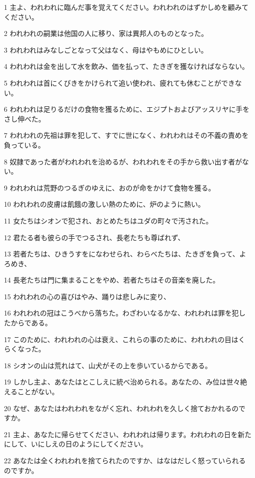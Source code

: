 \par 1 主よ、われわれに臨んだ事を覚えてください。われわれのはずかしめを顧みてください。
\par 2 われわれの嗣業は他国の人に移り、家は異邦人のものとなった。
\par 3 われわれはみなしごとなって父はなく、母はやもめにひとしい。
\par 4 われわれは金を出して水を飲み、価を払って、たきぎを獲なければならない。
\par 5 われわれは首にくびきをかけられて追い使われ、疲れても休むことができない。
\par 6 われわれは足りるだけの食物を獲るために、エジプトおよびアッスリヤに手をさし伸べた。
\par 7 われわれの先祖は罪を犯して、すでに世になく、われわれはその不義の責めを負っている。
\par 8 奴隷であった者がわれわれを治めるが、われわれをその手から救い出す者がない。
\par 9 われわれは荒野のつるぎのゆえに、おのが命をかけて食物を獲る。
\par 10 われわれの皮膚は飢餓の激しい熱のために、炉のように熱い。
\par 11 女たちはシオンで犯され、おとめたちはユダの町々で汚された。
\par 12 君たる者も彼らの手でつるされ、長老たちも尊ばれず、
\par 13 若者たちは、ひきうすをになわせられ、わらべたちは、たきぎを負って、よろめき、
\par 14 長老たちは門に集まることをやめ、若者たちはその音楽を廃した。
\par 15 われわれの心の喜びはやみ、踊りは悲しみに変り、
\par 16 われわれの冠はこうべから落ちた。わざわいなるかな、われわれは罪を犯したからである。
\par 17 このために、われわれの心は衰え、これらの事のために、われわれの目はくらくなった。
\par 18 シオンの山は荒れはて、山犬がその上を歩いているからである。
\par 19 しかし主よ、あなたはとこしえに統べ治められる。あなたの、み位は世々絶えることがない。
\par 20 なぜ、あなたはわれわれをながく忘れ、われわれを久しく捨ておかれるのですか。
\par 21 主よ、あなたに帰らせてください、われわれは帰ります。われわれの日を新たにして、いにしえの日のようにしてください。
\par 22 あなたは全くわれわれを捨てられたのですか、はなはだしく怒っていられるのですか。


